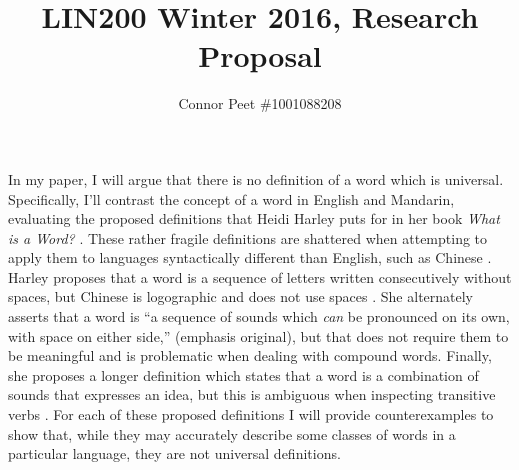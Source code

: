 \documentclass{article}
\title{LIN200 Winter 2016, Research Proposal}
\author{Connor Peet \#1001088208}
\begin{document}
\maketitle

In my paper, I will argue that there is no definition of a word which is universal. Specifically, I'll contrast the concept of a word in English and Mandarin, evaluating the proposed definitions that Heidi Harley puts for in her book \textit{What is a Word?} \cite{words}. These rather fragile definitions are shattered when attempting to apply them to languages syntactically different than English, such as Chinese \cite{mandarin}. Harley proposes that a word is a sequence of letters written consecutively without spaces, but Chinese is logographic and does not use spaces \cite{mandarin}. She alternately asserts that a word is ``a sequence of sounds which \textit{can} be pronounced on its own, with space on either side,'' (emphasis original), but that does not require them to be meaningful and is problematic when dealing with compound words. Finally, she proposes a longer definition which states that a word is a combination of sounds that expresses an idea, but this is ambiguous when inspecting transitive verbs \cite{chtrans}. For each of these proposed definitions I will provide counterexamples to show that, while they may accurately describe some classes of words in a particular language, they are not universal definitions.

\medskip

\printbibliography
\end{document}
